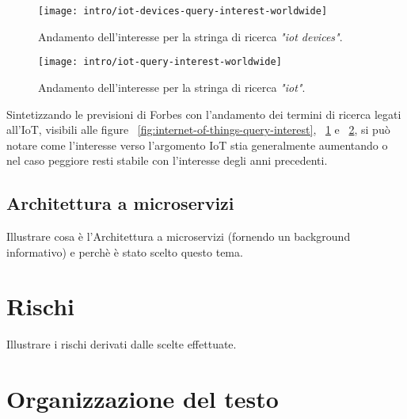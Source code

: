 \begin{figure}[!ht]
    \centering
    \texttt{[image: intro/iot-devices-query-interest-worldwide]}
    \caption{Andamento dell'interesse per la stringa di ricerca \textit{"iot devices"}. \\ \cite{site:iot-devices-trend}}
    \label{fig:iot-devices-query-interest}
\end{figure}

\begin{figure}[!ht]
    \centering
    \texttt{[image: intro/iot-query-interest-worldwide]}
    \caption{Andamento dell'interesse per la stringa di ricerca \textit{"iot"}. \\ \cite{site:iot-short-trend}}
    \label{fig:iot-query-interest}
\end{figure}

Sintetizzando le previsioni di Forbes con l'andamento dei termini di ricerca legati all'IoT, visibili alle figure ~\ref{fig:internet-of-things-query-interest}, ~\ref{fig:iot-devices-query-interest} e ~\ref{fig:iot-query-interest}, si può notare come l'interesse verso l'argomento IoT stia generalmente aumentando o nel caso peggiore resti stabile con l'interesse degli anni precedenti.

\subsection{Architettura a microservizi}

Illustrare cosa è l'Architettura a microservizi (fornendo un background informativo) e perchè è stato scelto questo tema.

\section{Rischi}

Illustrare i rischi derivati dalle scelte effettuate.

\section{Organizzazione del testo}

